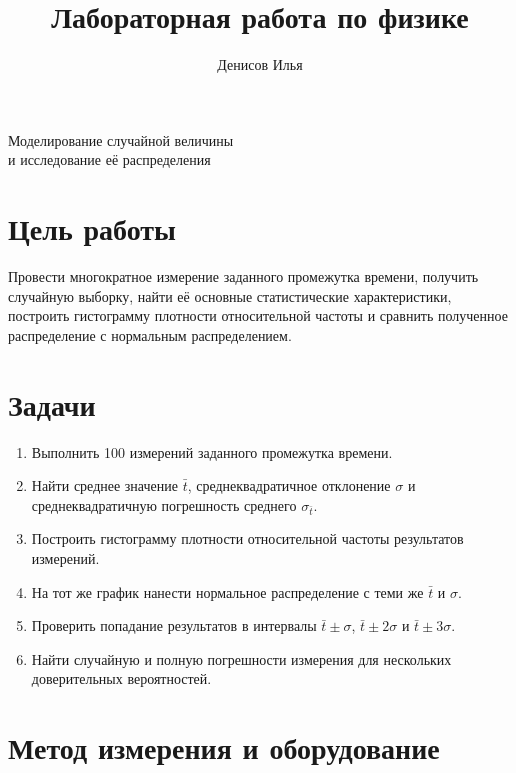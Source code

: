 \documentclass[12pt]{article}
\title{Лабораторная работа по физике}
\author{Денисов Илья}
\date{}
\begin{document}
    
    \maketitle
    
    \vspace{5cm}
    {\centering \LARGE Моделирование случайной величины \\ и исследование её распределения \par}

    \newpage
    
    \tableofcontents
	\setcounter{tocdepth}{3}
	
	\newpage
    
    \section{Цель работы}
    
    Провести многократное измерение заданного промежутка времени, получить случайную выборку, найти её основные статистические характеристики, построить гистограмму плотности относительной частоты и сравнить полученное распределение с нормальным распределением.
    
    \section{Задачи}
    
    \begin{enumerate}
        \item Выполнить 100 измерений заданного промежутка времени.
        \item Найти среднее значение $\bar t$, среднеквадратичное отклонение $\sigma$ и среднеквадратичную погрешность среднего $\sigma_{\bar t}$.
        \item Построить гистограмму плотности относительной частоты результатов измерений.
        \item На тот же график нанести нормальное распределение с теми же $\bar t$ и $\sigma$.
        \item Проверить попадание результатов в интервалы $\bar t \pm \sigma$, $\bar t \pm 2 \sigma$ и $\bar t \pm 3 \sigma$.
        \item Найти случайную и полную погрешности измерения для нескольких доверительных вероятностей.
    \end{enumerate}
    
    \section{Метод измерения и оборудование}
    
\end{document}
